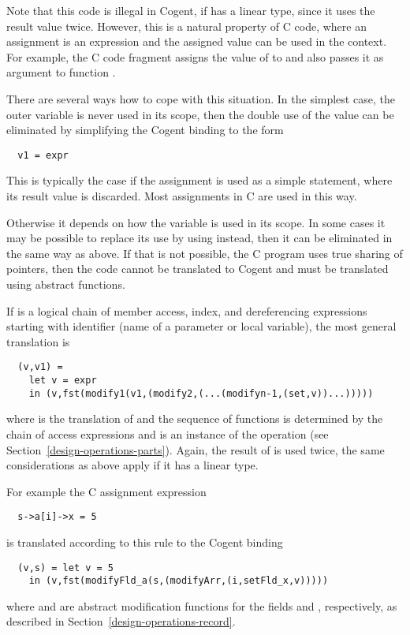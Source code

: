 Note that this code is illegal in Cogent, if  has a linear type, since it uses the result value twice. However, this
is a natural property of C code, where an assignment is an expression and the assigned value can be used in the context. For example,
the C code fragment  assigns the value of  to  and also passes it as argument to function .

There are several ways how to cope with this situation. In the simplest case, the outer variable  is never used in its
scope, then the double use of the value can be eliminated by simplifying the Cogent binding to the form
\begin{verbatim}
  v1 = expr
\end{verbatim}
This is typically the case if the assignment is used as a simple statement, where its result value is discarded. Most assignments
in C are used in this way.

Otherwise it depends on how the variable  is used in its scope. In some cases it may be possible to replace its use by 
using  instead, then it can be eliminated in the same way as above. If that is not possible, the C program uses true
sharing of pointers, then the code cannot be translated to Cogent and must be translated using abstract functions.

If  is a logical chain of  member access, index, and dereferencing expressions starting with identifier  
(name of a parameter or local variable), the most general translation is
\begin{verbatim}
  (v,v1) =
    let v = expr
    in (v,fst(modify1(v1,(modify2,(...(modifyn-1,(set,v))...)))))
\end{verbatim}
where  is the translation of  and the sequence of  functions is determined by the chain of access
expressions and  is an 
instance of the operation  (see Section~\ref{design-operations-parts}). Again, the result of  is used twice,
the same considerations as above apply if it has a linear type.

For example the C assignment expression
\begin{verbatim}
  s->a[i]->x = 5
\end{verbatim}
is translated according to this rule to the Cogent binding
\begin{verbatim}
  (v,s) = let v = 5
    in (v,fst(modifyFld_a(s,(modifyArr,(i,setFld_x,v)))))
\end{verbatim}
where  and  are abstract modification functions for the fields  and ,
respectively, as described in Section~\ref{design-operations-record}. 

